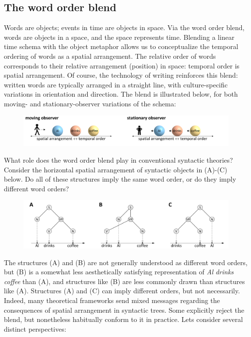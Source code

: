 \subsection{The word order blend}

Words are objects; events in time are objects in space. Via the word order blend, words are objects in a space, and the space represents time. Blending a linear time schema with the object metaphor allows us to conceptualize the temporal ordering of words as a spatial arrangement. The relative order of words corresponds to their relative arrangement (position) in space: temporal order is spatial arrangement. Of course, the technology of writing reinforces this blend: written words are typically arranged in a straight line, with culture-specific variations in orientation and direction. The blend is illustrated below, for both moving- and stationary-observer variations of the schema:

  
\begin{figure}
\includegraphics[width=\textwidth]{figures/Tilsen-img39.png}
\caption{\missingcaption}
\label{fig:}
\end{figure}
 

  What role does the word order blend play in conventional syntactic theories? Consider the horizontal spatial arrangement of syntactic objects in (A)-(C) below. Do all of these structures imply the same word order, or do they imply different word orders?

  
\begin{figure}
\includegraphics[width=\textwidth]{figures/Tilsen-img40.png}
\caption{\missingcaption}
\label{fig:}
\end{figure}
 

  The structures (A) and (B) are not generally understood as different word orders, but (B) is a somewhat less aesthetically satisfying representation of \textit{Al} \textit{drinks} \textit{coffee} than (A), and structures like (B) are less commonly drawn than structures like (A). Structures (A) and (C) can imply different orders, but not necessarily. Indeed, many theoretical frameworks send mixed messages regarding the consequences of spatial arrangement in syntactic trees. Some explicitly reject the blend, but nonetheless habitually conform to it in practice. Lets consider several distinct perspectives:


